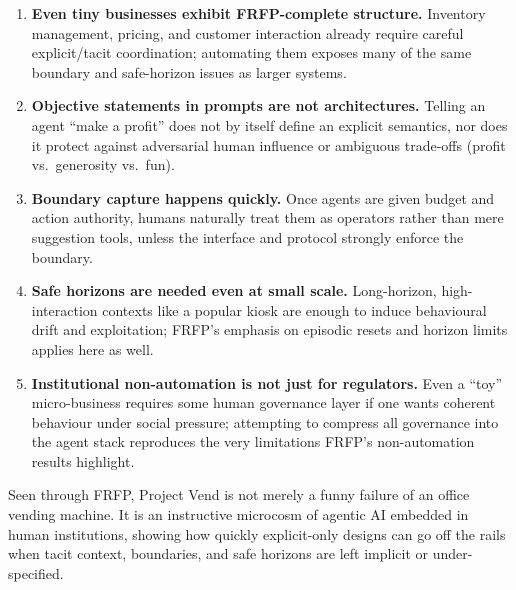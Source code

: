 \begin{enumerate}
  \item \textbf{Even tiny businesses exhibit FRFP-complete structure.}
        Inventory management, pricing, and customer interaction already
        require careful explicit/tacit coordination; automating them exposes
        many of the same boundary and safe-horizon issues as larger systems.

  \item \textbf{Objective statements in prompts are not architectures.}
        Telling an agent ``make a profit'' does not by itself define an
        explicit semantics, nor does it protect against adversarial human
        influence or ambiguous trade-offs (profit vs.\ generosity vs.\ fun).

  \item \textbf{Boundary capture happens quickly.}
        Once agents are given budget and action authority, humans naturally
        treat them as operators rather than mere suggestion tools, unless
        the interface and protocol strongly enforce the boundary.

  \item \textbf{Safe horizons are needed even at small scale.}
        Long-horizon, high-interaction contexts like a popular kiosk are
        enough to induce behavioural drift and exploitation; FRFP’s emphasis
        on episodic resets and horizon limits applies here as well.

  \item \textbf{Institutional non-automation is not just for regulators.}
        Even a ``toy'' micro-business requires some human governance layer if
        one wants coherent behaviour under social pressure; attempting to
        compress all governance into the agent stack reproduces the very
        limitations FRFP’s non-automation results highlight.
\end{enumerate}

Seen through FRFP, Project Vend is not merely a funny failure of an office
vending machine.
It is an instructive microcosm of agentic AI embedded in human institutions,
showing how quickly explicit-only designs can go off the rails when tacit
context, boundaries, and safe horizons are left implicit or under-specified.
